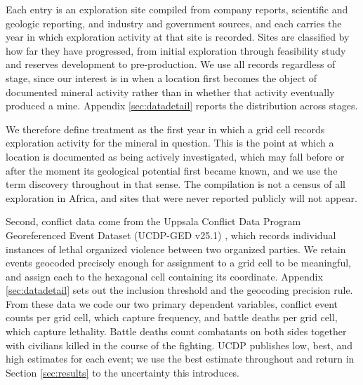 \documentclass[11pt]{article}
\begin{document}
Each entry is an exploration site compiled from company reports, scientific and geologic reporting, and industry and government sources, and each carries the year in which exploration activity at that site is recorded. Sites are classified by how far they have progressed, from initial exploration through feasibility study and reserves development to pre-production. We use all records regardless of stage, since our interest is in when a location first becomes the object of documented mineral activity rather than in whether that activity eventually produced a mine. Appendix \ref{sec:datadetail} reports the distribution across stages.

We therefore define treatment as the first year in which a grid cell records exploration activity for the mineral in question. This is the point at which a location is documented as being actively investigated, which may fall before or after the moment its geological potential first became known, and we use the term discovery throughout in that sense. The compilation is not a census of all exploration in Africa, and sites that were never reported publicly will not appear.

Second, conflict data come from the Uppsala Conflict Data Program Georeferenced Event Dataset (UCDP-GED v25.1) \citep{sundberg2013ucdp, pettersson2021organized}, which records individual instances of lethal organized violence between two organized parties. We retain events geocoded precisely enough for assignment to a grid cell to be meaningful, and assign each to the hexagonal cell containing its coordinate. Appendix \ref{sec:datadetail} sets out the inclusion threshold and the geocoding precision rule. From these data we code our two primary dependent variables, conflict event counts per grid cell, which capture frequency, and battle deaths per grid cell, which capture lethality. Battle deaths count combatants on both sides together with civilians killed in the course of the fighting. UCDP publishes low, best, and high estimates for each event; we use the best estimate throughout and return in Section \ref{sec:results} to the uncertainty this introduces.
\end{document}
